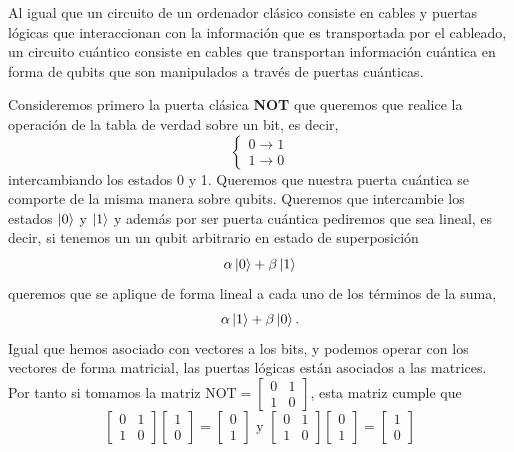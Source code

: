 \documentclass[a4paper]{article}
\numberwithin{equation}{section}
\begin{document}
Al igual que un circuito de un ordenador clásico consiste en cables y puertas lógicas que interaccionan con la información que es transportada por el cableado, un circuito cuántico consiste en cables que transportan información cuántica en forma de qubits que son manipulados a través de puertas cuánticas.

Consideremos primero la puerta clásica \textbf{NOT} que queremos que realice la operación de la tabla de verdad sobre un bit, es decir,
\begin{equation}
\begin{cases}
0 \rightarrow 1 \\
1 \rightarrow 0
\end{cases}
\end{equation}
intercambiando los estados 0 y 1. Queremos que nuestra puerta cuántica se comporte de la misma manera sobre qubits. Queremos que intercambie los estados $\ket{0}$ y $\ket{1}$ y además por ser puerta cuántica pediremos que sea lineal, es decir, si tenemos un un qubit arbitrario en estado de superposición
\begin{equation}
\alpha\ket{0} + \beta\ket{1}
\end{equation}
queremos que se aplique de forma lineal a cada uno de los términos de la suma,
\begin{equation}
\alpha\ket{1} + \beta\ket{0}.
\end{equation}
Igual que hemos asociado con vectores a los bits, y podemos operar con los vectores de forma matricial, las puertas lógicas están asociados a las matrices.
Por tanto si tomamos la matriz $\textrm{NOT} = \begin{bmatrix} 0 & 1 \\ 1 & 0 \end{bmatrix}$, esta matriz cumple que
\begin{equation}
\begin{bmatrix}
0 & 1 \\
1 & 0
\end{bmatrix}
\begin{bmatrix}
1 \\ 0
\end{bmatrix} =
\begin{bmatrix}
0 \\ 1
\end{bmatrix}
\textrm{ y }
\begin{bmatrix}
0 & 1 \\
1 & 0
\end{bmatrix}
\begin{bmatrix}
0 \\ 1
\end{bmatrix} =
\begin{bmatrix}
1 \\ 0
\end{bmatrix}
\end{equation}
\end{document}
